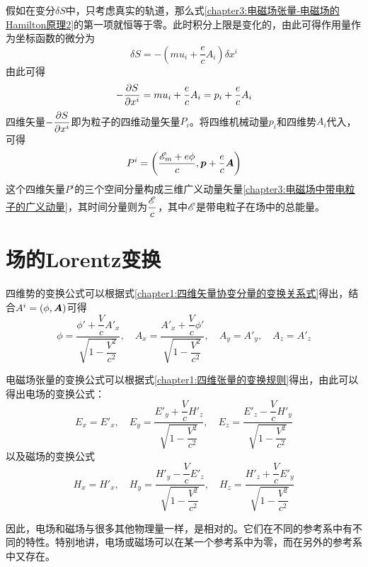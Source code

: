 假如在变分$\delta S$中，只考虑真实的轨道，那么式\eqref{chapter3:电磁场张量-电磁场的Hamilton原理2}的第一项就恒等于零。此时积分上限是变化的，由此可得作用量作为坐标函数的微分为
\begin{equation}
	\delta S = -\left(mu_i+\frac{e}{c}A_i\right)\delta x^i
	\label{chapter3:作用量对坐标的微分}
\end{equation}
由此可得
\begin{equation}
	-\frac{\partial S}{\partial x^i} = mu_i + \frac{e}{c}A_i = p_i+\frac{e}{c}A_i
	\label{chapter3:电磁场中带电粒子的四维动量}
\end{equation}
四维矢量$-\dfrac{\partial S}{\partial x^i}$即为粒子的四维动量矢量$P_i$。将四维机械动量$p_i$和四维势$A_i$代入，可得
\begin{equation}
	P^i = \left(\frac{\mathscr{E}_m+e\phi}{c},\boldsymbol{p} +\frac{e}{c}\boldsymbol{A}\right)
	\label{chapter3:电磁场中带电粒子的四维动量矢量}
\end{equation}
这个四维矢量$P^i$的三个空间分量构成三维广义动量矢量\eqref{chapter3:电磁场中带电粒子的广义动量}，其时间分量则为$\dfrac{\mathscr{E}}{c}$，其中$\mathscr{E}$是带电粒子在场中的总能量。

\section{场的Lorentz变换}

四维势的变换公式可以根据式\eqref{chapter1:四维矢量协变分量的变换关系式}得出，结合$A^i = (\phi,\boldsymbol{A})$可得
\begin{equation}
	\phi = \frac{\phi'+\dfrac{V}{c}A'_x}{\sqrt{1-\dfrac{V^2}{c^2}}},\quad
	A_x = \frac{A'_x+\dfrac{V}{c}\phi'}{\sqrt{1-\dfrac{V^2}{c^2}}},\quad
	A_y = A'_y,\quad A_z = A'_z
\label{chapter3:四维势的变换}
\end{equation}

电磁场张量的变换公式可以根据式\eqref{chapter1:四维张量的变换规则}得出，由此可以得出电场的变换公式：
\begin{equation}
	E_x = E'_x,\quad E_y = \frac{E'_y+\dfrac{V}{c}H'_z}{\sqrt{1-\dfrac{V^2}{c^2}}},\quad E_z = \frac{E'_z-\dfrac{V}{c}H'_y}{\sqrt{1-\dfrac{V^2}{c^2}}}
	\label{chapter3:电场的变换}
\end{equation}
以及磁场的变换公式
\begin{equation}
	H_x = H'_x,\quad H_y = \frac{H'_y-\dfrac{V}{c}E'_z}{\sqrt{1-\dfrac{V^2}{c^2}}},\quad H_z = \frac{H'_z+\dfrac{V}{c}E'_y}{\sqrt{1-\dfrac{V^2}{c^2}}}
	\label{chapter3:磁场的变换}
\end{equation}

因此，电场和磁场与很多其他物理量一样，是相对的。它们在不同的参考系中有不同的特性。特别地讲，电场或磁场可以在某一个参考系中为零，而在另外的参考系中又存在。

